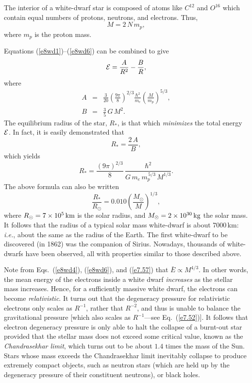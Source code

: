 The interior of a white-dwarf star is composed of atoms like
$C^{12}$ and $O^{16}$ which contain equal numbers of protons, neutrons, and
electrons. Thus,
\begin{equation}
M = 2\,N\,m_p,\label{e8wd6}
\end{equation}
where $m_p$ is the proton mass. 

Equations (\ref{e8wd1})--(\ref{e8wd6}) can be combined to give
\begin{equation}\label{e7.52}
{\cal E} = \frac{A}{R^2} - \frac{B}{R},
\end{equation}
where
\begin{eqnarray}
A &=& \frac{3}{20}\left(\frac{9\pi}{8}\right)^{2/3}\frac{\hbar^2}{m_e}
\left(\frac{M}{m_p}\right)^{5/3},\\[0.5ex]
B&=& \frac{3}{5}\,G\,M^2.
\end{eqnarray}
The equilibrium radius of the star, $R_\ast$, is that which
{\em minimizes} the total energy ${\cal E}$. In fact,
it is easily demonstrated that
\begin{equation}
R_\ast = \frac{2\,A}{B},
\end{equation}
which yields
\begin{equation}
R_\ast = \frac{(9\pi)^{2/3}}{8}\,\frac{\hbar^2}{G\,m_e\,m_p^{\,5/3}\,
M^{1/3}}.
\end{equation}
The above formula can also be written
\begin{equation}\label{e7.57}
\frac{R_\ast}{R_\odot}= 0.010\left(\frac{M_\odot}{M}\right)^{1/3},\label{e8wd9}
\end{equation}
where $R_\odot= 7\times 10^5\,{\rm km}$ is the solar radius, and
$M_\odot = 2\times 10^{30}\,{\rm kg}$  the solar mass. It follows that
the radius of a typical solar mass white-dwarf is about 7000\,km: 
{\em i.e.}, about the same as the radius of the Earth. The first
white-dwarf to be discovered (in 1862) was the companion of Sirius. Nowadays,
thousands of white-dwarfs have been observed, all with properties similar
to those described above.


Note from Eqs.~(\ref{e8wd4}), (\ref{e8wd6}), and (\ref{e7.57})
that $\bar{E}\propto M^{4/3}$. In other words, the mean energy of the
electrons inside a white dwarf {\em increases}\/ as the  stellar mass increases.
Hence, for a sufficiently massive white dwarf, the electrons can become
{\em relativistic}. It turns out that the degeneracy pressure for
relativistic electrons only scales as $R^{-1}$, rather that $R^{-2}$, 
and thus is unable to balance the gravitational pressure [which also
scales as $R^{-1}$---see Eq.~(\ref{e7.52})]. It follows that electron
 degeneracy pressure is only able to halt the collapse of a burnt-out star
 provided that the stellar mass does not exceed some critical value, known
 as the {\em Chandrasekhar limit},
 which turns out to be about $1.4$ times the mass of the Sun. Stars
 whose mass exceeds the Chandrasekhar limit inevitably collapse to
 produce extremely compact objects, such as neutron stars (which are
 held up by the degeneracy pressure of their constituent neutrons), 
 or black holes.

